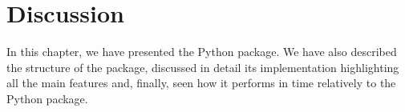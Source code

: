 \section{Discussion}
In this chapter, we have presented the \LTLfToDFA Python package. We have also described the structure of the package, discussed in detail its implementation highlighting all the main features and, finally, seen how it performs in time relatively to the \FLLOAT Python package.


















